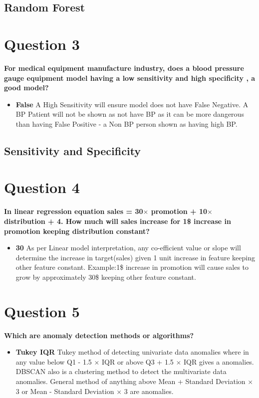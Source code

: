 \documentclass[10pt,letterpaper]{article}
\begin{document}
\subsection{Random Forest}

\section{Question 3}
\textbf{For medical equipment manufacture industry, does a blood pressure gauge equipment model having a low sensitivity and high specificity , a good model?}
\begin{itemize}
\item \textbf{False} A High Sensitivity will ensure model does not have False Negative. A BP Patient will not be shown as not have BP as it can be more dangerous than having False Positive - a Non BP person shown as having high BP.
\end{itemize}

\subsection{Sensitivity and Specificity}

\section{Question 4}
\textbf{In linear regression equation sales = 30$\times$ promotion + 10$\times$ distribution + 4. How much will sales increase for 1\$ increase in promotion keeping distribution constant?}
\begin{itemize}
\item \textbf{30} As per Linear model interpretation, any co-efficient value or slope will determine the increase in target(sales) given 1 unit increase in feature keeping other feature constant. Example:1\$ increase in promotion will cause sales to grow by approximately 30\$ keeping other feature constant.

\end{itemize}

\section{Question 5}
\textbf{Which are anomaly detection methods or algorithms?}
\begin{itemize}
\item \textbf{Tukey IQR} Tukey method of detecting univariate data anomalies where in any value below Q1 - 1.5 $\times$ IQR or above Q3 + 1.5 $\times$ IQR gives a anomalies. DBSCAN also is a clustering method to detect the multivariate data anomalies. General method of anything above Mean + Standard Deviation $\times$ 3 or Mean - Standard Deviation $\times$ 3 are anomalies.
\end{itemize}
\end{document}
